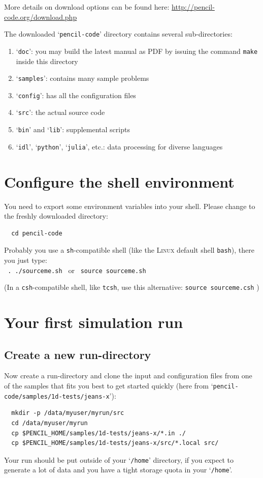 \documentclass[a4paper,12pt]{article}
\newcommand{\command}[1]{\texttt{#1}}
\newcommand{\directory}[1]{`\texttt{#1}'}
\newcommand{\name}[1]{\textsc{#1}}
\begin{document}
More details on download options can be found here: \url{http://pencil-code.org/download.php}

The downloaded \directory{pencil-code} directory contains several sub-directories:
\begin{enumerate}
  \item \directory{doc}: you may build the latest manual as PDF by issuing the command \command{make} inside this directory
  \item \directory{samples}: contains many sample problems
  \item \directory{config}: has all the configuration files
  \item \directory{src}: the actual source code
  \item \directory{bin} and \directory{lib}: supplemental scripts
  \item \directory{idl}, \directory{python}, \directory{julia}, etc.: data processing for diverse languages
\end{enumerate}


\section{Configure the shell environment}

You need to export some environment variables into your shell.
Please change to the freshly downloaded directory:
\begin{verbatim}
  cd pencil-code
\end{verbatim}

Probably you use a \command{sh}-compatible shell (like the \name{Linux} default shell \command{bash}), there you just type:\\[2mm]
\command{ . ./sourceme.sh  }  or  \command{  source sourceme.sh}

(In a \command{csh}-compatible shell, like \command{tcsh}, use this alternative: \command{source sourceme.csh} )


\section{Your first simulation run}

\subsection{Create a new run-directory}

Now create a run-directory and clone the input and configuration files from one of the samples that fits you best to get started quickly (here from \directory{pencil-code/samples/1d-tests/jeans-x}):
\begin{verbatim}
  mkdir -p /data/myuser/myrun/src
  cd /data/myuser/myrun
  cp $PENCIL_HOME/samples/1d-tests/jeans-x/*.in ./
  cp $PENCIL_HOME/samples/1d-tests/jeans-x/src/*.local src/
\end{verbatim}
Your run should be put outside of your \directory{/home} directory, if you expect to generate a lot of data and you have a tight storage quota in your \directory{/home}.
\end{document}
